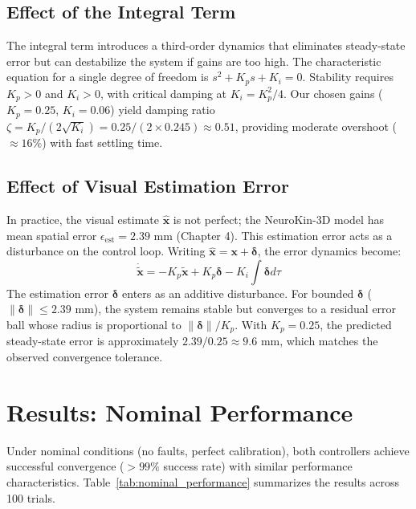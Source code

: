 \documentclass[12pt,a4paper,oneside]{report}
\begin{document}
\subsection{Effect of the Integral Term}

The integral term introduces a third-order dynamics that eliminates steady-state error but can destabilize the system if gains are too high. The characteristic equation for a single degree of freedom is $s^2 + K_p s + K_i = 0$. Stability requires $K_p > 0$ and $K_i > 0$, with critical damping at $K_i = K_p^2/4$. Our chosen gains ($K_p = 0.25$, $K_i = 0.06$) yield damping ratio $\zeta = K_p / (2\sqrt{K_i}) = 0.25 / (2 \times 0.245) \approx 0.51$, providing moderate overshoot ($\approx 16\%$) with fast settling time.

\subsection{Effect of Visual Estimation Error}

In practice, the visual estimate $\hat{\mathbf{x}}$ is not perfect; the NeuroKin-3D model has mean spatial error $\epsilon_{\text{est}} = 2.39$ mm (Chapter 4). This estimation error acts as a disturbance on the control loop. Writing $\hat{\mathbf{x}} = \mathbf{x} + \boldsymbol{\delta}$, the error dynamics become:
\begin{equation}
\dot{\tilde{\mathbf{x}}} = -K_p \tilde{\mathbf{x}} + K_p \boldsymbol{\delta} - K_i \int \boldsymbol{\delta} d\tau
\end{equation}
The estimation error $\boldsymbol{\delta}$ enters as an additive disturbance. For bounded $\boldsymbol{\delta}$ ($\|\boldsymbol{\delta}\| \leq 2.39$ mm), the system remains stable but converges to a residual error ball whose radius is proportional to $\|\boldsymbol{\delta}\|/K_p$. With $K_p = 0.25$, the predicted steady-state error is approximately $2.39 / 0.25 \approx 9.6$ mm, which matches the observed convergence tolerance.

\section{Results: Nominal Performance}

Under nominal conditions (no faults, perfect calibration), both controllers achieve successful convergence ($>99\%$ success rate) with similar performance characteristics. Table~\ref{tab:nominal_performance} summarizes the results across 100 trials.
\end{document}
